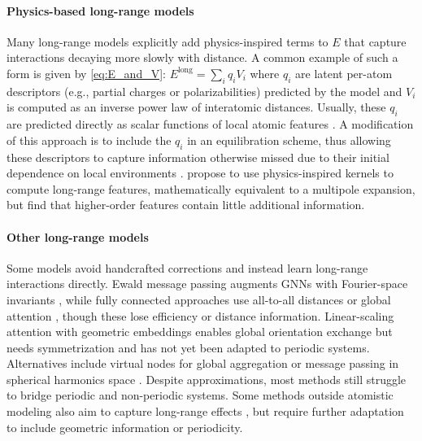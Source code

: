 \documentclass[10pt]{article} %
\begin{document}
\paragraph{Physics-based long-range models}
Many long-range models explicitly add physics-inspired terms to $E$ that capture interactions decaying more slowly with distance.
A common example of such a form is given by \cref{eq:E_and_V}: $E^{\mathrm{long}} = \sum_i q_i V_i$  where \( q_i \) are latent per-atom descriptors (e.g., partial charges or polarizabilities) predicted by the model and $V_i$ is computed as an inverse power law of interatomic distances.
% 
Usually, these \( q_i \) are predicted directly as scalar functions of local atomic features \citep{ucgssm2021,shscrm2021,lhhxrhlc2025,kkzc2024,jlx2025,kfdksucmt2025, c2025}.
A modification of this approach is to include the \( q_i \) in an equilibration scheme, thus allowing these descriptors to capture information otherwise missed due to their initial dependence on local environments \citep{kfgb2021,plsk2023,mka2025}.
\citet{gc2019,hlhc2023} propose to use physics-inspired kernels to compute long-range features, mathematically equivalent to a multipole expansion, but find that higher-order features contain little additional information.

\paragraph{Other long-range models}
Some models avoid handcrafted corrections and instead learn long-range interactions directly. Ewald message passing augments GNNs with Fourier-space invariants \citep{kggg2023}, while fully connected approaches use all-to-all distances \citep{csmt2018} or global attention \citep{ucgssm2021}, though these lose efficiency or distance information. Linear-scaling attention with geometric embeddings \citep{fcmu2024} enables global orientation exchange but needs symmetrization and has not yet been adapted to periodic systems. Alternatives include virtual nodes for global aggregation \citep{cvgrnc2025} or message passing in spherical harmonics space \citep{fum2022}. Despite approximations, most methods still struggle to bridge periodic and non-periodic systems.
Some methods outside atomistic modeling also aim to capture long-range effects \citep{drgpwlb2022, bgrbd2025, mpxclm2025, zwm2025}, but require further adaptation to include geometric information or periodicity.
\end{document}
